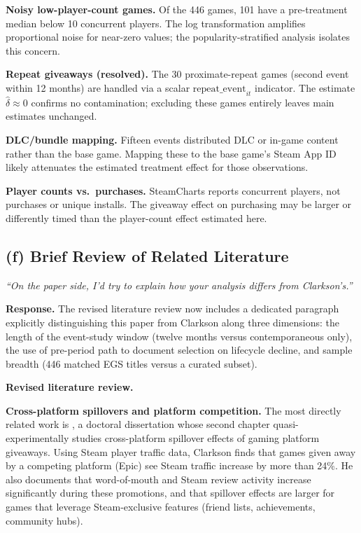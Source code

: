 \documentclass[11pt]{article}
\begin{document}
\textbf{Noisy low-player-count games.} Of the 446 games, 101 have a
pre-treatment median below 10 concurrent players. The log transformation
amplifies proportional noise for near-zero values; the popularity-stratified
analysis isolates this concern.

\textbf{Repeat giveaways (resolved).} The 30 proximate-repeat games (second
event within 12 months) are handled via a scalar $\text{repeat\_event}_{it}$
indicator. The estimate $\hat{\delta} \approx 0$ confirms no contamination;
excluding these games entirely leaves main estimates unchanged.

\textbf{DLC/bundle mapping.} Fifteen events distributed DLC or in-game
content rather than the base game. Mapping these to the base game's Steam
App ID likely attenuates the estimated treatment effect for those
observations.

\textbf{Player counts vs.\ purchases.} SteamCharts reports concurrent
players, not purchases or unique installs. The giveaway effect on purchasing
may be larger or differently timed than the player-count effect estimated
here.

\subsection{(f) Brief Review of Related Literature}

\begin{feedbackbox}
\small\textit{``On the paper side, I'd try to explain how your analysis
differs from Clarkson's.''}
\end{feedbackbox}

\textbf{Response.}
The revised literature review now includes a dedicated paragraph
explicitly distinguishing this paper from Clarkson along three dimensions:
the length of the event-study window (twelve months versus contemporaneous
only), the use of pre-period path to document selection on lifecycle decline,
and sample breadth (446 matched EGS titles versus a curated subset).

\textbf{Revised literature review.}

\textbf{Cross-platform spillovers and platform competition.}
The most directly related work is \citet{clarkson2025}, a doctoral
dissertation whose second chapter quasi-experimentally studies cross-platform
spillover effects of gaming platform giveaways. Using Steam player traffic
data, Clarkson finds that games given away by a competing platform (Epic) see
Steam traffic increase by more than 24\%. He also documents that word-of-mouth
and Steam review activity increase significantly during these promotions, and
that spillover effects are larger for games that leverage Steam-exclusive
features (friend lists, achievements, community hubs).
\end{document}
